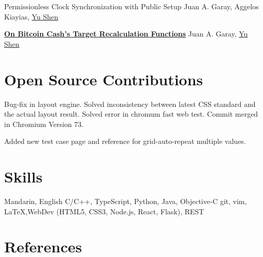\documentclass[11pt, a4paper, sans]{moderncv} %
\begin{document}
{Permissionless Clock Synchronization with Public Setup}
{}
{}
{}
{\normalsize Juan A. Garay, Aggelos Kiayias, \underline{Yu Shen}}

{\textbf{\href{https://www.youtube.com/watch?v=5K6HNCtLPtk}{On Bitcoin Cash's Target Recalculation Functions}}}
{}
{}
{}
{\normalsize Juan A. Garay, \underline{Yu Shen}}

\section{Open Source Contributions}

{Bug-fix in layout engine. Solved inconsistency between latest CSS standard and the actual layout result. Solved error in chromum fast web test. Commit merged in Chromium Version 73.}

{Added new test case page and reference for grid-auto-repeat multiple values.}


\section{Skills}

{Mandarin, English}
{C/C++, TypeScript, Python, Java, Objective-C}
{git, vim, \LaTeX,WebDev (HTML5, CSS3, Node.js, React, Flask), REST}


\section{References}

\end{document}
